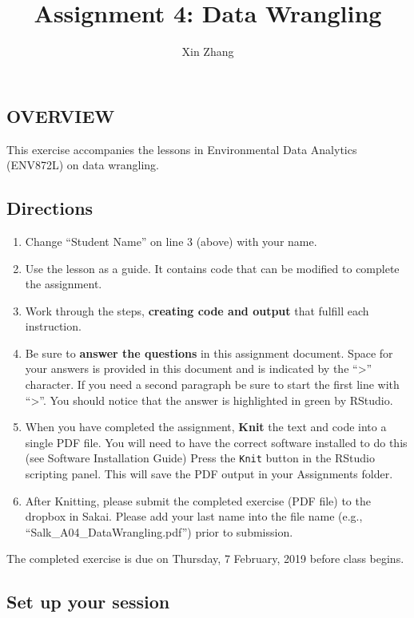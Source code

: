 \documentclass[]{article}
\title{Assignment 4: Data Wrangling}
\author{Xin Zhang}
\date{}
\providecommand{\tightlist}{%
  \setlength{\itemsep}{0pt}\setlength{\parskip}{0pt}}
\begin{document}
\maketitle

\subsection{OVERVIEW}\label{overview}

This exercise accompanies the lessons in Environmental Data Analytics
(ENV872L) on data wrangling.

\subsection{Directions}\label{directions}

\begin{enumerate}
\def\labelenumi{\arabic{enumi}.}
\tightlist
\item
  Change ``Student Name'' on line 3 (above) with your name.
\item
  Use the lesson as a guide. It contains code that can be modified to
  complete the assignment.
\item
  Work through the steps, \textbf{creating code and output} that fulfill
  each instruction.
\item
  Be sure to \textbf{answer the questions} in this assignment document.
  Space for your answers is provided in this document and is indicated
  by the ``\textgreater{}'' character. If you need a second paragraph be
  sure to start the first line with ``\textgreater{}''. You should
  notice that the answer is highlighted in green by RStudio.
\item
  When you have completed the assignment, \textbf{Knit} the text and
  code into a single PDF file. You will need to have the correct
  software installed to do this (see Software Installation Guide) Press
  the \texttt{Knit} button in the RStudio scripting panel. This will
  save the PDF output in your Assignments folder.
\item
  After Knitting, please submit the completed exercise (PDF file) to the
  dropbox in Sakai. Please add your last name into the file name (e.g.,
  ``Salk\_A04\_DataWrangling.pdf'') prior to submission.
\end{enumerate}

The completed exercise is due on Thursday, 7 February, 2019 before class
begins.

\subsection{Set up your session}\label{set-up-your-session}
\end{document}
